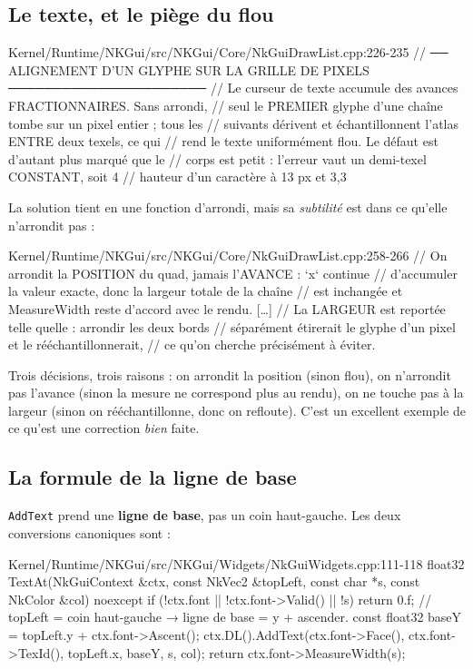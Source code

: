 \subsection{Le texte, et le piège du flou}

\begin{nkcode}{Kernel/Runtime/NKGui/src/NKGui/Core/NkGuiDrawList.cpp:226-235}
// ── ALIGNEMENT D'UN GLYPHE SUR LA GRILLE DE PIXELS ──────────────────────
// Le curseur de texte accumule des avances FRACTIONNAIRES. Sans arrondi,
// seul le PREMIER glyphe d'une chaîne tombe sur un pixel entier ; tous les
// suivants dérivent et échantillonnent l'atlas ENTRE deux texels, ce qui
// rend le texte uniformément flou. Le défaut est d'autant plus marqué que le
// corps est petit : l'erreur vaut un demi-texel CONSTANT, soit 4 %
// hauteur d'un caractère à 13 px et 3,3 %
\end{nkcode}

La solution tient en une fonction d'arrondi, mais sa \emph{subtilité} est dans
ce qu'elle n'arrondit pas :

\begin{nkcode}{Kernel/Runtime/NKGui/src/NKGui/Core/NkGuiDrawList.cpp:258-266}
// On arrondit la POSITION du quad, jamais l'AVANCE : `x` continue
// d'accumuler la valeur exacte, donc la largeur totale de la chaîne
// est inchangée et MeasureWidth reste d'accord avec le rendu. […]
// La LARGEUR est reportée telle quelle : arrondir les deux bords
// séparément étirerait le glyphe d'un pixel et le rééchantillonnerait,
// ce qu'on cherche précisément à éviter.
\end{nkcode}

Trois décisions, trois raisons : on arrondit la position (sinon flou), on
n'arrondit pas l'avance (sinon la mesure ne correspond plus au rendu), on ne
touche pas à la largeur (sinon on rééchantillonne, donc on refloute). C'est un
excellent exemple de ce qu'est une correction \emph{bien} faite.

\subsection{La formule de la ligne de base}

\texttt{AddText} prend une \textbf{ligne de base}, pas un coin haut-gauche. Les
deux conversions canoniques sont :

\begin{nkcode}{Kernel/Runtime/NKGui/src/NKGui/Widgets/NkGuiWidgets.cpp:111-118}
float32 TextAt(NkGuiContext &ctx, const NkVec2 &topLeft, const char *s, const NkColor &col) noexcept {
    if (!ctx.font || !ctx.font->Valid() || !s) return 0.f;
    // topLeft = coin haut-gauche → ligne de base = y + ascender.
    const float32 baseY = topLeft.y + ctx.font->Ascent();
    ctx.DL().AddText(ctx.font->Face(), ctx.font->TexId(), {topLeft.x, baseY}, s, col);
    return ctx.font->MeasureWidth(s);
}
\end{nkcode}

